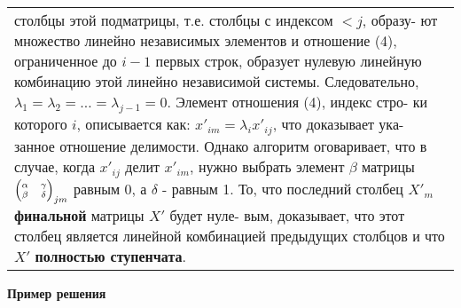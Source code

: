 \documentclass{mai_book}
\begin{document}
	\begin{tabular}{|p{12.5cm}}
	\noindent
	столбцы этой подматрицы, т.е. столбцы с индексом $< j$, образу-\linebreak
	ют множество линейно независимых элементов и отношение (4),\linebreak
	ограниченное до $i - 1$ первых строк, образует нулевую линейную\linebreak
	комбинацию этой линейно независимой системы. Следовательно,\linebreak
	$\lambda_1 = \lambda_2 = \ldots = \lambda_{j - 1} = 0$. Элемент отношения (4), индекс стро-\linebreak
	ки которого $i$, описывается как: $x'_{im} = \lambda_i x'_{ij}$, что доказывает ука-\linebreak
	занное отношение делимости. Однако алгоритм оговаривает, что\linebreak
	в случае, когда $x'_{ij}$ делит $x'_{im}$, нужно выбрать элемент $\beta$ матрицы\linebreak
	${\scriptsize \begin{pmatrix} \alpha & \gamma\\ \beta & \delta \end{pmatrix}_{jm}}$ равным 0, а $\delta$ - равным 1.\linebreak
	То, что последний столбец $X'_m$ {\bf финальной} матрицы $X'$ будет нуле-\linebreak
	вым, доказывает, что этот столбец является линейной комбинацией\linebreak
	предыдущих столбцов и что $X'$ {\bf полностью ступенчата}.
	\end{tabular}
	
	\noindent
	{\bf Пример решения}
	
\end{document}
